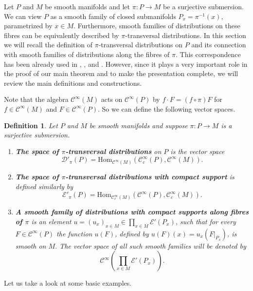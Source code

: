 \documentclass[a4paper]{amsart}
\newtheorem{dfn}{Definition}[section]
\newcommand{\cD}{\mathcal{D}}
\newcommand{\cE}{\mathcal{E}}
\newcommand{\Hom}{\text{Hom}}
\newcommand{\com}{\mathbin{{\scriptstyle \circ }}}
\newcommand{\C}{\mathord{\mathcal{C}^{\infty}}}
\newcommand{\Cc}{\mathord{\mathcal{C}^{\infty}_{c}}}
\begin{document}
Let $P$ and $M$ be smooth manifolds and let $\pi:P\to M$ be a surjective submersion. We can view $P$ as a smooth family
of closed submanifolds $P_{x}=\pi^{-1}(x)$, parametrized by $x\in M$. Furthermore, smooth families of distributions on these fibres
can be equivalently described by $\pi$-transversal distributions.
In this section we will recall the definition of $\pi$-transversal
distributions on $P$ and its connection with smooth families of distributions along the fibres of $\pi$. This 
correspondence has been already used in \cite{AnSk11}, \cite{LeMaVa17}, \cite{ErYu19} and \cite{AnMoYu21}. 
However, since it plays a very important role in the proof of our main theorem and to make the presentation complete, we will
review the main definitions and constructions.

Note that the algebra $\C(M)$ acts on $\C(P)$ by $f\cdot F=(f\com\pi)F$ for $f\in\C(M)$ and $F\in\C(P)$. So we can
define the following vector spaces.

\begin{dfn}
Let $P$ and $M$ be smooth manifolds and suppose $\pi:P\to M$ is a surjective submersion. 
\begin{enumerate}
\item \textbf{The space of $\pi$-transversal distributions} on $P$ is the vector space
\[
\cD'_{\pi}(P)=\Hom_{\C(M)}(\Cc(P),\C(M)).
\]

\item \textbf{The space of $\pi$-transversal distributions with compact support} is defined similarly by 
\[
\cE'_{\pi}(P)=\Hom_{\Cc(M)}(\C(P),\Cc(M)).
\]

\item \textbf{A smooth family of distributions with compact supports along fibres of $\pi$} is an element $u=(u_{x})_{x\in M}\in\prod_{x\in M}\cE'(P_{x})$,
such that for every $F\in\C(P)$ the function $u(F)$, defined by $u(F)(x)=u_{x}(F|_{P_{x}})$, is smooth on $M$. The vector
space of all such smooth families will be denoted by
\[
\C(\prod_{x\in M}\cE'(P_{x})).
\]
\end{enumerate}
\end{dfn}

Let us take a look at some basic examples.
\end{document}
